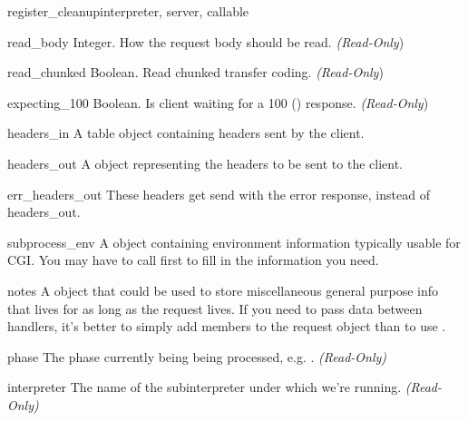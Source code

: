 \begin{funcdesc}{register_cleanup}{interpreter, server, callable}
\begin{memberdesc}[request]{read_body}
  Integer. How the request body should be read.
  \emph{(Read-Only})
\end{memberdesc}

\begin{memberdesc}[request]{read_chunked}
  Boolean. Read chunked transfer coding.
  \emph{(Read-Only})
\end{memberdesc}

\begin{memberdesc}[request]{expecting_100}
  Boolean. Is client waiting for a 100 () response.
  \emph{(Read-Only})
\end{memberdesc}

\begin{memberdesc}[request]{headers_in}
  A table object containing headers sent by the client.
\end{memberdesc}

\begin{memberdesc}[request]{headers_out}
  A  object representing the headers to be sent to the
  client. 
\end{memberdesc}

\begin{memberdesc}[request]{err_headers_out}
  These headers get send with the error response, instead of
  headers_out.
\end{memberdesc}

\begin{memberdesc}[request]{subprocess_env}
  A  object containing environment information typically usable for CGI.
  You may have to call  first to fill in the information
  you need.
\end{memberdesc}

\begin{memberdesc}[request]{notes}
  A  object that could be used to store miscellaneous
  general purpose info that lives for as long as the request lives. If
  you need to pass data between handlers, it's better to simply add
  members to the request object than to use .
\end{memberdesc}

\begin{memberdesc}[request]{phase}
  The phase currently being being processed, e.g. .
  \emph{(Read-Only)}
\end{memberdesc}

\begin{memberdesc}[request]{interpreter}
  The name of the subinterpreter under which we're running.
  \emph{(Read-Only)}
\end{memberdesc}


\end{funcdesc}
